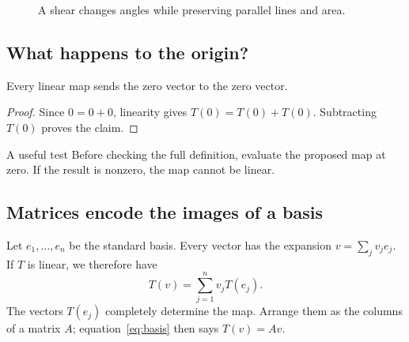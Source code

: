 \documentclass{hubbardbook}
\begin{document}
\begin{figure}[htbp]
\centering
{}
\caption{A shear changes angles while preserving parallel lines and area.}
\label{fig:shear}
\end{figure}

\subsection{What happens to the origin?}
\begin{proposition}\label{prop:zero}
Every linear map sends the zero vector to the zero vector.
\end{proposition}
\begin{proof}
Since \(0=0+0\), linearity gives \(T(0)=T(0)+T(0)\).
Subtracting \(T(0)\) proves the claim.
\end{proof}

\begin{textblock}{A useful test}
Before checking the full definition, evaluate the proposed map at zero.
If the result is nonzero, the map cannot be linear.
\end{textblock}

\clearpage
\subsection{Matrices encode the images of a basis}
Let \(e_1,\ldots,e_n\) be the standard basis. Every vector has the
expansion \(v=\sum_jv_je_j\). If \(T\) is linear, we therefore have
\begin{equation}\label{eq:basis}
  T(v)=\sum_{j=1}^{n}v_jT(e_j).
\end{equation}
The vectors \(T(e_j)\) completely determine the map. Arrange them as the
columns of a matrix \(A\); equation~\ref{eq:basis} then says \(T(v)=Av\).
\end{document}
